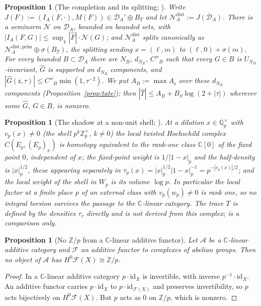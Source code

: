 \documentclass[11pt]{amsart}
\newtheorem{proposition}[theorem]{Proposition}
\theoremstyle{definition}
\theoremstyle{remark}
\newcommand{\C}{\mathbb C}
\newcommand{\Z}{\mathbb Z}
\newcommand{\Q}{\mathbb Q}
\newcommand{\DA}{\mathcal D_A}
\begin{document}
\begin{proposition}[The completion and its splitting;
{\cite[Lemma~8.12, Thms.~8.11, 8.14]{Companion}}]\label{prop:completion}
Write $J(F):=(I_A(F,\cdot),M(F))\in\DA'\oplus B_T$ and let
$\mathcal N_A^{\mathrm{dist}}:=\overline{J(\DA)}$. There is a seminorm
$\mathcal N$ on $\DA$, bounded on bounded sets, with
$|I_A(F,G)|\le\sup_\chi|\widehat F|\cdot\mathcal N(G)$; and
$\mathcal N_A^{\mathrm{dist}}$ splits canonically as
$\mathcal N_A^{\mathrm{dist,prim}}\oplus\sigma(B_T)$, the splitting sending
$x=(\ell,m)$ to $(\ell,0)+\sigma(m)$. For every bounded $B\subset\DA$ there
are $N_B$, $d_{N_B}$, $C''_B$ such that every $G\in B$ is
$U_{N_B}$-invariant, $\widehat G$ is supported on $d_{N_B}$ components, and
$|\widehat G(\mathfrak c,\tau)|\le C''_B\min(1,\tau^{-2})$. We put
$A_B:=\max A_{\mathfrak c}$ over these $d_{N_B}$ components
(Proposition~\ref{prop:tate}); then $|\widehat T|\le A_B+B_S\log(2+|\tau|)$
wherever some $\widehat G$, $G\in B$, is nonzero.
\end{proposition}

\begin{proposition}[The shadow at a non-unit shell;
{\cite[Lemma~5.7, Thm.~5.12(c), Prop.~6.13(a)]{Companion}}]\label{prop:shadow}
At a dilation $x\in\Q_p^\times$ with $v_p(x)\ne0$ (the shell $p^k\Z_p^\times$,
$k\ne0$) the local twisted Hochschild complex $C(E_p,(E_p)_x)$ is homotopy
equivalent to the rank-one class $\C[0]$ of the fixed point $0$, independent
of $x$; the fixed-point weight is $1/|1-x|_p$ and the half-density is
$|x|_p^{1/2}$, these appearing separately in
$\tau_p(x)=|x|_p^{1/2}|1-x|_p^{-1}=p^{-|v_p(x)|/2}$; and the local weight of
the shell in $W_p$ is its volume $\log p$. In particular the local factor at
a finite place $p$ of an external class with $v_p(w_p)\ne0$ is rank one, so no
integral torsion survives the passage to the $\C$-linear category. The trace
$T$ is defined by the densities $\tau_v$ directly and is \emph{not} derived
from this complex; \cite[Prop.~6.13]{Companion} is a comparison only.
\end{proposition}

\begin{proposition}[No $\Z/p$ from a $\C$-linear additive functor]
\label{prop:noZp}
Let $\mathcal A$ be a $\C$-linear additive category and $\mathcal F$ an
additive functor to complexes of abelian groups. Then no object of
$\mathcal A$ has $H^0\mathcal F(X)\cong\Z/p$.
\end{proposition}

\begin{proof}
In a $\C$-linear additive category $p\cdot\mathrm{id}_X$ is invertible, with
inverse $p^{-1}\cdot\mathrm{id}_X$. An additive functor carries
$p\cdot\mathrm{id}_X$ to $p\cdot\mathrm{id}_{\mathcal F(X)}$ and preserves
invertibility, so $p$ acts bijectively on $H^0\mathcal F(X)$. But $p$ acts as
$0$ on $\Z/p$, which is nonzero.
\end{proof}
\end{document}

